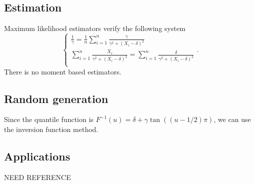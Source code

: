 \subsection{Estimation}
Maximum likelihood estimators verify the following system
$$
\left\{
\begin{array}{l}
\frac{1}{\gamma} = \frac{1}{n} \sum\limits_{i=1}^n\frac{\gamma}{\gamma^2+(X_i-\delta)^2}\\
\sum\limits_{i=1}^n\frac{X_i}{\gamma^2+(X_i-\delta)^2} = \sum\limits_{i=1}^n\frac{\delta}{\gamma^2+(X_i-\delta)^2}\\
\end{array}
\right. .
$$
There is no moment based estimators.

\subsection{Random generation}
Since the quantile function is $F^{-1}(u) = \delta+\gamma\tan((u-1/2)\pi)$, we can use the inversion function method.

\subsection{Applications}
NEED REFERENCE
